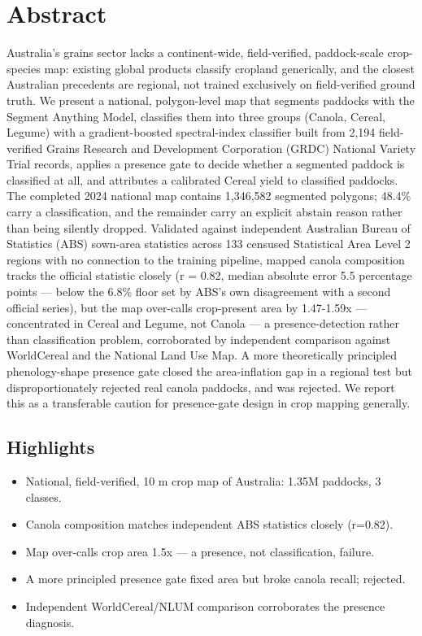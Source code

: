 
\section*{Abstract}\label{abstract}

Australia's grains sector lacks a continent-wide, field-verified, paddock-scale crop-species map: existing global products classify cropland generically, and the closest Australian precedents are regional, not trained exclusively on field-verified ground truth. We present a national, polygon-level map that segments paddocks with the Segment Anything Model, classifies them into three groups (Canola, Cereal, Legume) with a gradient-boosted spectral-index classifier built from 2,194 field-verified Grains Research and Development Corporation (GRDC) National Variety Trial records, applies a presence gate to decide whether a segmented paddock is classified at all, and attributes a calibrated Cereal yield to classified paddocks. The completed 2024 national map contains 1,346,582 segmented polygons; 48.4\% carry a classification, and the remainder carry an explicit abstain reason rather than being silently dropped. Validated against independent Australian Bureau of Statistics (ABS) sown-area statistics across 133 censused Statistical Area Level 2 regions with no connection to the training pipeline, mapped canola composition tracks the official statistic closely (r = 0.82, median absolute error 5.5 percentage points --- below the 6.8\% floor set by ABS's own disagreement with a second official series), but the map over-calls crop-present area by 1.47-1.59x --- concentrated in Cereal and Legume, not Canola --- a presence-detection rather than classification problem, corroborated by independent comparison against WorldCereal and the National Land Use Map. A more theoretically principled phenology-shape presence gate closed the area-inflation gap in a regional test but disproportionately rejected real canola paddocks, and was rejected. We report this as a transferable caution for presence-gate design in crop mapping generally.

\subsection{Highlights}\label{highlights}

\begin{itemize}
\tightlist
\item
  National, field-verified, 10 m crop map of Australia: 1.35M paddocks, 3 classes.
\item
  Canola composition matches independent ABS statistics closely (r=0.82).
\item
  Map over-calls crop area 1.5x --- a presence, not classification, failure.
\item
  A more principled presence gate fixed area but broke canola recall; rejected.
\item
  Independent WorldCereal/NLUM comparison corroborates the presence diagnosis.
\end{itemize}

